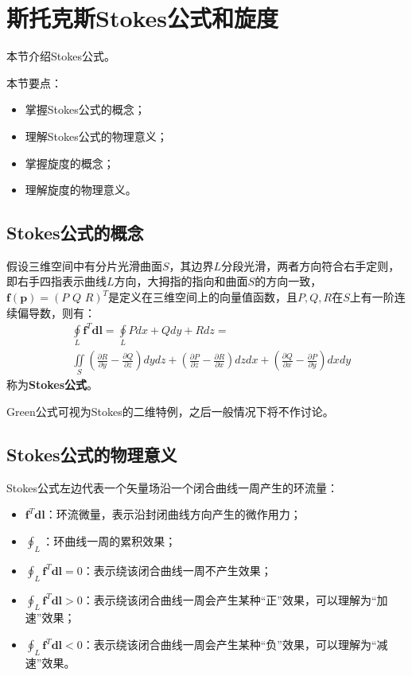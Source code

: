 \section{斯托克斯Stokes公式和旋度}

本节介绍Stokes公式。

本节要点：
\begin{itemize}
    \item 掌握Stokes公式的概念；
    \item 理解Stokes公式的物理意义；
    \item 掌握旋度的概念；
    \item 理解旋度的物理意义。
\end{itemize}

\subsection{Stokes公式的概念}

\begin{definition}[Stokes公式]
假设三维空间中有分片光滑曲面$S$，其边界$L$分段光滑，两者方向符合右手定则，即右手四指表示曲线$L$方向，大拇指的指向和曲面$S$的方向一致，$\boldsymbol{f}\left( \boldsymbol{p} \right) =\left( P\,\,Q\,\,R \right) ^T$是定义在三维空间上的向量值函数，且$P,Q,R$在$S$上有一阶连续偏导数，则有：
\begin{align*}
&\oint\limits_L{\boldsymbol{f}^T\boldsymbol{dl}}=\oint\limits_L{Pdx+Qdy+Rdz}= \\
&\iint\limits_S{\left( \frac{\partial R}{\partial y}-\frac{\partial Q}{\partial z} \right) dydz+\left( \frac{\partial P}{\partial z}-\frac{\partial R}{\partial x} \right) dzdx+\left( \frac{\partial Q}{\partial x}-\frac{\partial P}{\partial y} \right) dxdy}
\end{align*}
称为{\bf Stokes公式}。
\end{definition}

Green公式可视为Stokes的二维特例，之后一般情况下将不作讨论。

\subsection{Stokes公式的物理意义}

Stokes公式左边代表一个矢量场沿一个闭合曲线一周产生的环流量：
\begin{itemize}
    \item $\boldsymbol{f}^T\boldsymbol{dl}$：环流微量，表示沿封闭曲线方向产生的微作用力；
    \item $\oint_L$：环曲线一周的累积效果；
    \item $\oint_L{\boldsymbol{f}^T\boldsymbol{dl}}=0$：表示绕该闭合曲线一周不产生效果；
    \item $\oint_L{\boldsymbol{f}^T\boldsymbol{dl}}>0$：表示绕该闭合曲线一周会产生某种“正”效果，可以理解为“加速”效果；
    \item $\oint_L{\boldsymbol{f}^T\boldsymbol{dl}}<0$：表示绕该闭合曲线一周会产生某种“负”效果，可以理解为“减速”效果。
\end{itemize}

